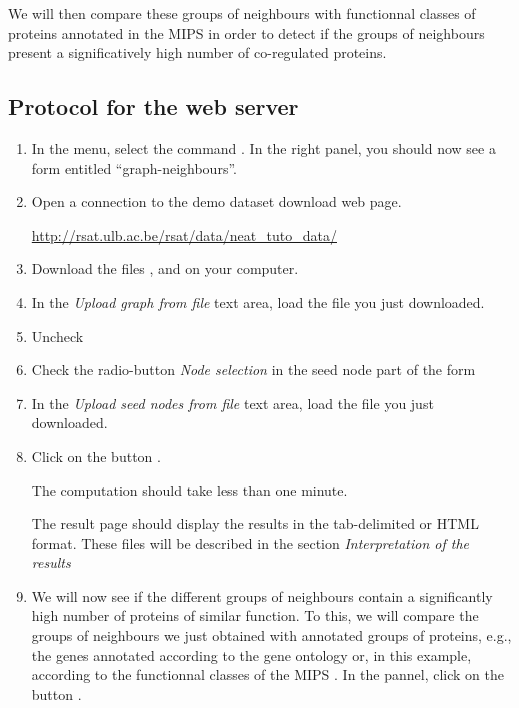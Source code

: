 We will then compare these groups of neighbours with functionnal
classes of proteins annotated in the MIPS \cite{Mewes2007} in order to
detect if the groups of neighbours present a significatively high
number of co-regulated proteins.

\subsection{Protocol for the web server}

\begin{enumerate}

\item In the \neat menu, select the command .  In the right panel, you should now see a form
  entitled ``graph-neighbours''.

\item Open a connection to the demo dataset download web page.

  \url{http://rsat.ulb.ac.be/rsat/data/neat\_tuto\_data/} 

\item  Download the files ,
   and
   on your computer.

\item In the \textit{Upload graph from file} text area, load the file
   you just downloaded.

\item Uncheck 

\item Check the radio-button \textit{Node selection} in the seed node
  part of the form

\item In the \textit{Upload seed nodes from file} text area, load the
  file  you just downloaded.

\item Click on the button . 

  The computation should take less than one minute.
  
  The result page should display the results in the tab-delimited or
  HTML format. These files will be described in the section
  \textit{Interpretation of the results}

\item We will now see if the different groups of neighbours contain a
  significantly high number of proteins of similar function. To this,
  we will compare the groups of neighbours we just obtained with
  annotated groups of proteins, e.g., the genes annotated according to
  the gene ontology \cite{GO2007} or, in this example, according to
  the functionnal classes of the MIPS \cite{Mewes2007}. In the
   pannel, click on the button .


\end{enumerate}
